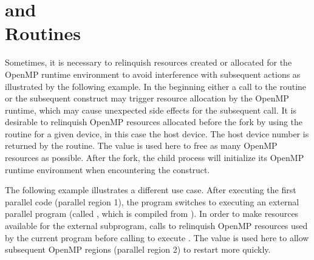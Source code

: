 \section{ and \\
   Routines}
\label{sec:pause_resource}

Sometimes, it is necessary to relinquish resources created or allocated
for the OpenMP runtime environment to avoid interference with subsequent
actions as illustrated by the following example.  In the beginning 
either a call to the  routine 
or the subsequent  construct may trigger resource allocation
by the OpenMP runtime, which may cause unexpected side effects 
for the subsequent  call.
It is desirable to relinquish OpenMP resources allocated before 
the fork by using the  routine for a given
device, in this case the host device.  The host device number is returned by 
the  routine.
The  value is used here to free as many
OpenMP resources as possible.
After the fork, the child process will initialize its OpenMP runtime
environment when encountering the  construct.

\pagebreak

The following example illustrates a different use case. 
After executing the first parallel code (parallel region 1), 
the  program switches to executing an external parallel program
(called , which is compiled from ).  
In order to make resources available for the external
subprogram,  calls 
to relinquish OpenMP resources used by the current program before
calling  to execute .
The  value is used here to allow subsequent
OpenMP regions (parallel region 2) to restart more quickly.

